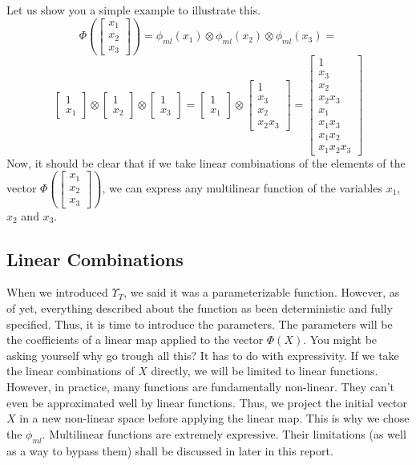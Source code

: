 \documentclass{article}
\theoremstyle{definition}
\theoremstyle{definition}
\begin{document}
Let us show you a simple example to illustrate this.
\[
    \Phi(\begin{bmatrix}x_1 \\ x_2 \\ x_3 \end{bmatrix})
    =
    \phi_{ml}(x_1) \otimes \phi_{ml}(x_2) \otimes \phi_{ml}(x_3)
    =
\]
\[
\begin{bmatrix}
    1 \\ x_1
\end{bmatrix}
\otimes
\begin{bmatrix}
    1 \\ x_2
\end{bmatrix}
\otimes
\begin{bmatrix}
    1 \\ x_3
\end{bmatrix}
=
\begin{bmatrix}
    1 \\ x_1
\end{bmatrix}
\otimes
\begin{bmatrix}
    1 \\ x_3 \\ x_2 \\ x_2 x_3
\end{bmatrix}
=
\begin{bmatrix}
    1 \\ x_3 \\ x_2 \\ x_2 x_3 \\ x_1 \\ x_1 x_3 \\ x_1 x_2 \\ x_1 x_2 x_3
\end{bmatrix}
\]
Now, it should be clear that if we take linear combinations of the elements of the vector $\Phi(\begin{bmatrix}x_1 \\ x_2 \\ x_3 \end{bmatrix})$, we can express any multilinear function of the variables $x_1$, $x_2$ and $x_3$.
\subsection{Linear Combinations}

When we introduced $\Upsilon_{T}$, we said it was a parameterizable function. However, as of yet, everything described about the function as been deterministic and fully specified. Thus, it is time to introduce the parameters. The parameters will be the coefficients of a linear map applied to the vector $\Phi(X)$. You might be asking yourself why go trough all this? It has to do with expressivity. If we take the linear combinations of $X$ directly, we will be limited to linear functions. However, in practice, many functions are fundamentally non-linear. They can't even be approximated well by linear functions. Thus, we project the initial vector $X$ in a new non-linear space before applying the linear map. This is why we chose the $\phi_{ml}$. Multilinear functions are extremely expressive. Their limitations (as well as a way to bypass them) shall be discussed in later in this report. \\ 
\end{document}

